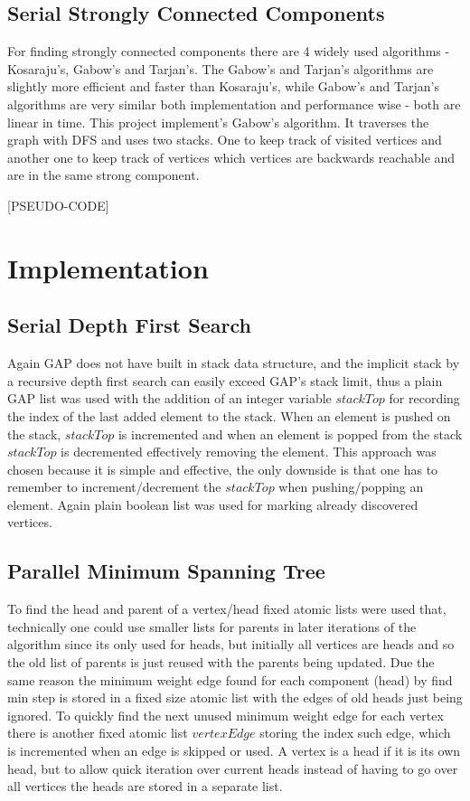 \documentclass{report}
\theoremstyle{plain}
\theoremstyle{definition}
\theoremstyle{remark}
\begin{document}
\section{Serial Strongly Connected Components}

For finding strongly connected components there are 4 widely used algorithms - Kosaraju's, Gabow's and Tarjan's. The Gabow's and Tarjan's algorithms are slightly more efficient and faster than Kosaraju's, while Gabow's and Tarjan's algorithms are very similar both implementation and performance wise - both are linear in time. This project implement's Gabow's algorithm. It traverses the graph with DFS and uses two stacks. One to keep track of visited vertices and another one to keep track of vertices which vertices are backwards reachable and are in the same strong component.

[PSEUDO-CODE]

\chapter{Implementation}

\section{Serial Depth First Search}

Again GAP does not have built in stack data structure, and the implicit stack by a recursive depth first search can easily exceed GAP's stack limit, thus a plain GAP list was used with the addition of an integer variable $stackTop$ for recording the index of the last added element to the stack. When an element is pushed on the stack, $stackTop$ is incremented and when an element is popped from the stack $stackTop$ is decremented effectively removing the element. This approach was chosen because it is simple and effective, the only downside is that one has to remember to increment/decrement the $stackTop$ when pushing/popping an element. Again plain boolean list was used for marking already discovered vertices.

\section{Parallel Minimum Spanning Tree}

To find the head and parent of a vertex/head fixed atomic lists were used that, technically one could use smaller lists for parents in later iterations of the algorithm since its only used for heads, but initially all vertices are heads and so the old list of parents is just reused with the parents being updated. Due the same reason the minimum weight edge found for each component (head) by find min step is stored in a fixed size atomic list with the edges of old heads just being ignored. To quickly find the next unused minimum weight edge for each vertex there is another fixed atomic list $vertexEdge$ storing the index such edge, which is incremented when an edge is skipped or used. A vertex is a head if it is its own head, but to allow quick iteration over current heads instead of having to go over all vertices the heads are stored in a separate list.
\end{document}
